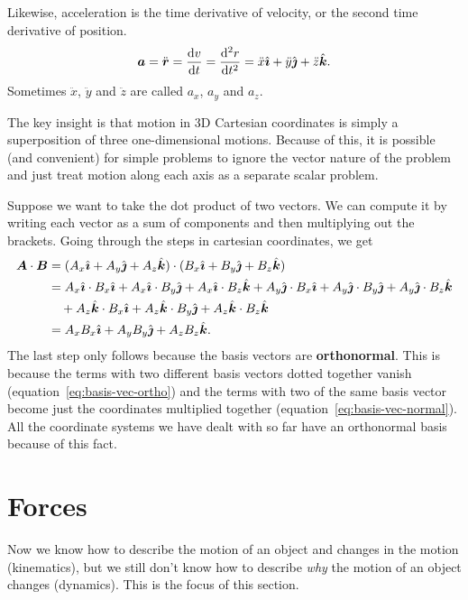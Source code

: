 \documentclass[../classical_mechanics.tex]{subfiles}
\begin{document}
        \begin{definition}
            Likewise, acceleration is the time derivative of velocity, or the second time derivative of position.
            \begin{equation}
                \vec{a}=\ddot{\vec{r}}=\dv{v}{t}=\dv[2]{r}{t}=\ddot{x}\ihat+\ddot{y}\jhat+\ddot{z}\khat.
            \end{equation}
            Sometimes $\ddot{x}$, $\ddot{y}$ and $\ddot{z}$ are called $a_x$, $a_y$ and $a_z$.
        \end{definition}
        The key insight is that motion in 3D Cartesian coordinates is simply a superposition of three one-dimensional motions.
        Because of this, it is possible (and convenient) for simple problems to ignore the vector nature of the problem and just treat motion along each axis as a separate scalar problem.
        
        Suppose we want to take the dot product of two vectors.
        We can compute it by writing each vector as a sum of components and then multiplying out the brackets.
        Going through the steps in cartesian coordinates, we get
        \begin{align}
            \boldsymbol{A}\cdot\boldsymbol{B}&=(A_x\hat{\boldsymbol{\imath}}+A_y\hat{\boldsymbol{\jmath}}+A_z\hat{\boldsymbol{k}})\cdot(B_x\hat{\boldsymbol{\imath}}+B_y\hat{\boldsymbol{\jmath}}+B_z\hat{\boldsymbol{k}})\\
            &\begin{aligned}
                &=A_x\hat{\boldsymbol{\imath}}\cdot B_x\hat{\boldsymbol{\imath}}+A_x\hat{\boldsymbol{\imath}}\cdot B_y\hat{\boldsymbol{\jmath}}+A_x\hat{\boldsymbol{\imath}}\cdot B_z\hat{\boldsymbol{k}}+A_y\hat{\boldsymbol{\jmath}}\cdot B_x\hat{\boldsymbol{\imath}}+A_y\hat{\boldsymbol{\jmath}}\cdot B_y\hat{\boldsymbol{\jmath}}+A_y\hat{\boldsymbol{\jmath}}\cdot B_z\hat{\boldsymbol{k}}\\
                &\quad+A_z\hat{\boldsymbol{k}}\cdot B_x\hat{\boldsymbol{\imath}}+A_z\hat{\boldsymbol{k}}\cdot B_y\hat{\boldsymbol{\jmath}}+A_z\hat{\boldsymbol{k}}\cdot B_z\hat{\boldsymbol{k}}
            \end{aligned}\\
            &=A_xB_x\hat{\boldsymbol{\imath}}+A_yB_y\hat{\boldsymbol{\jmath}}+A_zB_z\hat{\boldsymbol{k}}.
        \end{align}
        The last step only follows because the basis vectors are \textbf{orthonormal}.
        This is because the terms with two different basis vectors dotted together vanish (equation~\ref{eq:basis-vec-ortho}) and the terms with two of the same basis vector become just the coordinates multiplied together (equation~\ref{eq:basis-vec-normal}).
        All the coordinate systems we have dealt with so far have an orthonormal basis because of this fact.

    \section{Forces}\label{sec:forces}
        Now we know how to describe the motion of an object and changes in the motion (kinematics), but we still don't know how to describe \textit{why} the motion of an object changes (dynamics).
        This is the focus of this section.
\end{document}
